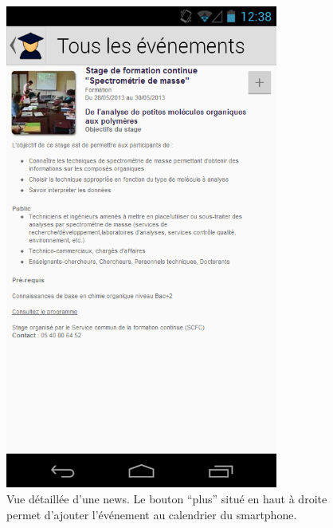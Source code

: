 \documentclass [pdftex,12pt] {report}
\begin{document}
\begin{figure}
\begin{minipage}[t]{8cm}
    \includegraphics[width=0.8\textwidth]{resources/ui_preview/06}
    \caption{Vue détaillée d'une news. Le bouton ``plus'' situé en haut à droite permet d'ajouter l’événement au calendrier du smartphone.}
    \label{fig:06}
  \end{minipage}
  \hspace{-60pt}
\end{figure}
\end{document}
